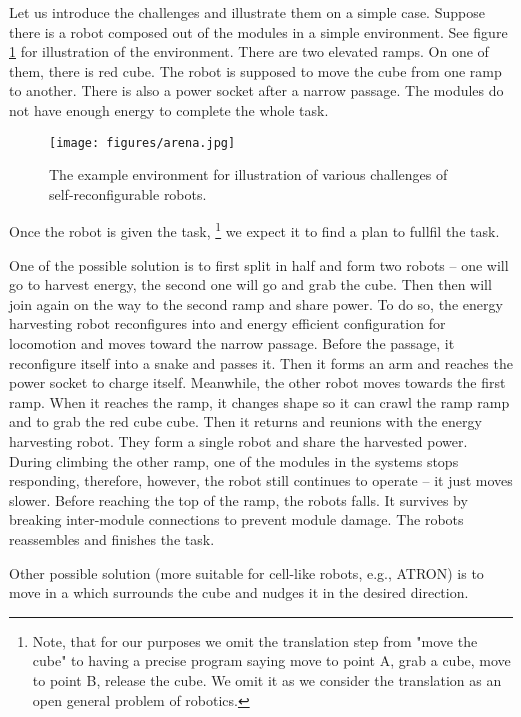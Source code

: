 Let us introduce the challenges and illustrate them on a simple case. Suppose
there is a robot composed out of the modules in a simple environment. See figure
\ref{fig:arena} for illustration of the environment. There are two elevated
ramps. On one of them, there is red cube. The robot is supposed to move the cube
from one ramp to another. There is also a power socket after a narrow passage.
The modules do not have enough energy to complete the whole task.

\begin{figure}[!t]
    \centering
    \texttt{[image: figures/arena.jpg]}
    \caption{The example environment for illustration of various challenges of
    self-reconfigurable robots.}
    \label{fig:arena}
\end{figure}

Once the robot is given the task, \footnote{Note, that for our purposes we omit
the translation step from "move the cube" to having a precise program saying
move to point A, grab a cube, move to point B, release the cube. We omit it as
we consider the translation as an open general problem of robotics.} we expect
it to find a plan to fullfil the task.

One of the possible solution is to first split in half and form two robots --
one will go to harvest energy, the second one will go and grab the cube. Then
then will join again on the way to the second ramp and share power. To do so,
the energy harvesting robot reconfigures into and energy efficient configuration
for locomotion and moves toward the narrow passage. Before the passage, it
reconfigure itself into a snake and passes it. Then it forms an arm and reaches
the power socket to charge itself. Meanwhile, the other robot moves towards the
first ramp. When it reaches the ramp, it changes shape so it can crawl the ramp
ramp and to grab the red cube cube. Then it returns and reunions with the energy
harvesting robot. They form a single robot and share the harvested power. During
climbing the other ramp, one of the modules in the systems stops responding,
therefore, however, the robot still continues to operate -- it just moves
slower. Before reaching the top of the ramp, the robots falls. It survives by
breaking inter-module connections to prevent module damage. The robots
reassembles and finishes the task.

Other possible solution (more suitable for cell-like robots, e.g., ATRON) is to
move in a  which surrounds the cube and nudges it in
the desired direction.

